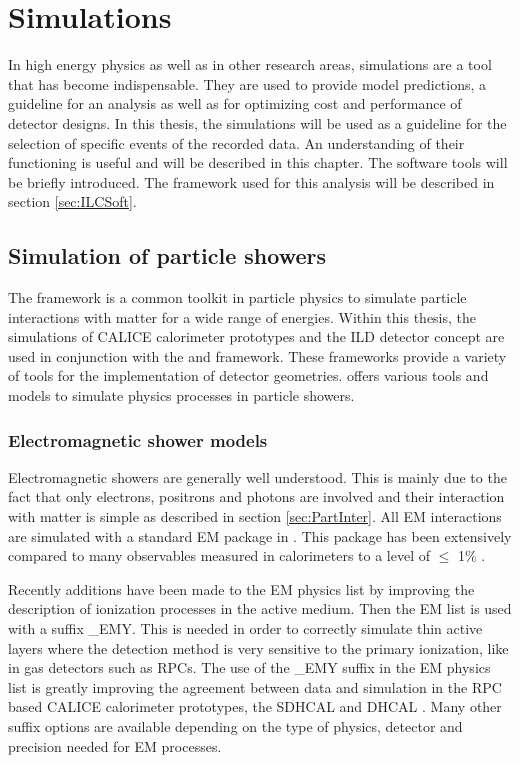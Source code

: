 \chapter{\geant Simulations}
\label{chap:G4Simulation}

In high energy physics as well as in other research areas, simulations are a tool that has become indispensable. They are used to provide model predictions, a guideline for an analysis as well as for optimizing cost and performance of detector designs. In this thesis, the simulations will be used as a guideline for the selection of specific events of the recorded data. An understanding of their functioning is useful and will be described in this chapter. The software tools will be briefly introduced. The \ilcsoft framework used for this analysis will be described in section \ref{sec:ILCSoft}.

\section{Simulation of particle showers}

The \geant framework \cite{Agostinelli2003} is a common toolkit in particle physics to simulate particle interactions with matter for a wide range of energies. Within this thesis, the simulations of CALICE calorimeter prototypes and the ILD detector concept are used in conjunction with the \mokka \cite{Freitas2003} and \ddhep \cite{Frank2014} framework. These frameworks provide a variety of tools for the implementation of detector geometries. \geant offers various tools and models to simulate physics processes in particle showers.

\subsection{Electromagnetic shower models}

Electromagnetic showers are generally well understood. This is mainly due to the fact that only electrons, positrons and photons are involved and their interaction with matter is simple as described in section \ref{sec:PartInter}. All EM interactions are simulated with a standard EM package in \geant \cite{Ivanchenko2010}. This package has been extensively compared to many observables measured in calorimeters to a level of $\leq$ 1\% \cite{Apostolakis2015}.

Recently additions have been made to the \geant EM physics list by improving the description of ionization processes in the active medium. Then the EM list is used with a suffix \_{}EMY. This is needed in order to correctly simulate thin active layers where the detection method is very sensitive to the primary ionization, like in gas detectors such as RPCs. The use of the \_{}EMY suffix in the EM physics list is greatly improving the agreement between data and simulation in the RPC based CALICE calorimeter prototypes, the SDHCAL and DHCAL \cite{Neubueser2016}. Many other suffix options are available depending on the type of physics, detector and precision needed for EM processes.

